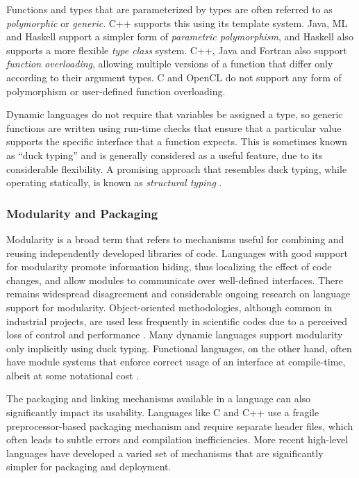 \documentclass[12pt]{article}
\begin{document}
Functions and types that are parameterized by types are often referred to as {\it polymorphic} or {\it generic}. C++ supports this using its template system. Java, ML and Haskell support a simpler form of {\it parametric polymorphism}, and Haskell also supports a more flexible {\it type class} system. C++, Java and Fortran also support {\it function overloading}, allowing multiple versions of a function that differ only according to their argument types. C and OpenCL do not support any form of polymorphism or user-defined function overloading.

Dynamic languages do not require that variables be assigned a type, so generic functions are written using run-time checks that ensure that a particular value supports the specific interface that a function expects. This is sometimes known as ``duck typing'' and is generally considered as a useful feature, due to its considerable flexibility. A promising approach that resembles duck typing, while operating statically, is known as {\it structural typing} \cite{malayeri2009structural}.

\subsubsection{Modularity and Packaging}\label{modularity}
Modularity is a broad term that refers to mechanisms useful for combining and reusing independently developed libraries of code. Languages with good support for modularity promote information hiding, thus localizing the effect of code changes, and allow modules to communicate over well-defined interfaces. There remains widespread disagreement and considerable ongoing research on language support for modularity. Object-oriented methodologies, although common in industrial projects, are used less frequently in scientific codes due to a perceived loss of control and performance \cite{basili2008understanding}. Many dynamic languages support modularity only implicitly using duck typing. Functional languages, on the other hand, often have module systems that enforce correct usage of an interface at compile-time, albeit at some notational cost \cite{tapl}.

The packaging and linking mechanisms available in a language can also significantly impact its usability. Languages like C and C++ use a fragile preprocessor-based packaging mechanism and require separate header files, which often leads to subtle errors and compilation inefficiencies. More recent high-level languages have developed a varied set of mechanisms that are significantly simpler for packaging and deployment.
\end{document}

